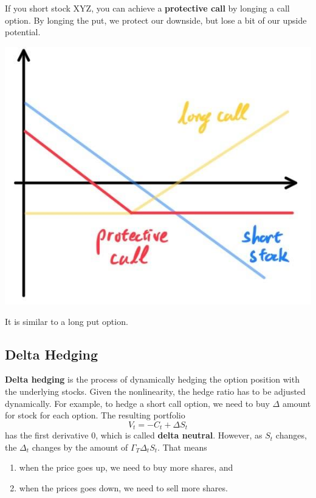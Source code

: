 \documentclass{article}
\begin{document}
\begin{definition}
If you short stock XYZ, you can achieve a \textbf{protective call} by longing a call option. By longing the put, we protect our downside, but lose a bit of our upside potential. 
\begin{center}
    \includegraphics[scale=0.3]{img/protective_call.jpg}
\end{center}
It is similar to a long put option. 
\end{definition}

\subsection{Delta Hedging}

\begin{definition}
\textbf{Delta hedging} is the process of dynamically hedging the option position with the underlying stocks. Given the nonlinearity, the hedge ratio has to be adjusted dynamically. For example, to hedge a short call option, we need to buy $\Delta$ amount for stock for each option. The resulting portfolio 
\[V_t = -C_t + \Delta S_t\] 
has the first derivative $0$, which is called \textbf{delta neutral}. However, as $S_t$ changes, the $\Delta_t$ changes by the amount of $\Gamma_T \Delta_t S_t$. That means 
\begin{enumerate}
    \item when the price goes up, we need to buy more shares, and 
    \item when the prices goes down, we need to sell more shares. 
\end{enumerate}
\end{definition}
\end{document}
